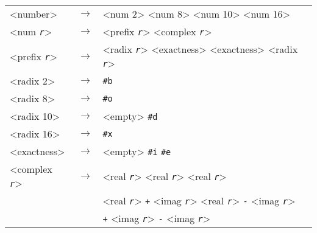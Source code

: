   {\footnotesize
\begin{tabular}[H]{lcl}

\textless{}number\textgreater{} & \(\longrightarrow\) & \textless{}num 2\textgreater{} \textbar{} \textless{}num 8\textgreater{} \textbar{} \textless{}num 10\textgreater{} \textbar{} \textless{}num 16\textgreater{} \\

\textless{}num \texttt{\textit{r}}\textgreater{} & \(\longrightarrow\) & \textless{}prefix \texttt{\textit{r}}\textgreater{} \textless{}complex \texttt{\textit{r}}\textgreater{} \\

\textless{}prefix \texttt{\textit{r}}\textgreater{} & \(\longrightarrow\) & \textless{}radix \texttt{\textit{r}}\textgreater{} \textless{}exactness\textgreater{} \textbar{} \textless{}exactness\textgreater{} \textless{}radix \texttt{\textit{r}}\textgreater{} \\

\textless{}radix 2\textgreater{} & \(\longrightarrow\) & \texttt{\#{}b} \\

\textless{}radix 8\textgreater{} & \(\longrightarrow\) & \texttt{\#{}o} \\

\textless{}radix 10\textgreater{} & \(\longrightarrow\) & \textless{}empty\textgreater{} \textbar{} \texttt{\#{}d} \\

\textless{}radix 16\textgreater{} & \(\longrightarrow\) & \texttt{\#{}x} \\

\textless{}exactness\textgreater{} & \(\longrightarrow\) & \textless{}empty\textgreater{} \textbar{} \texttt{\#{}i} \textbar{} \texttt{\#{}e} \\

\textless{}complex \texttt{\textit{r}}\textgreater{} & \(\longrightarrow\) & \textless{}real \texttt{\textit{r}}\textgreater{} \textbar{} \textless{}real \texttt{\textit{r}}\textgreater{} \@{} \textless{}real \texttt{\textit{r}}\textgreater{} \\

  & \textbar{} & \textless{}real \texttt{\textit{r}}\textgreater{} \texttt{+} \textless{}imag \texttt{\textit{r}}\textgreater{} \textbar{} \textless{}real \texttt{\textit{r}}\textgreater{} \texttt{-} \textless{}imag \texttt{\textit{r}}\textgreater{} \\

  & \textbar{} & \texttt{+} \textless{}imag \texttt{\textit{r}}\textgreater{} \textbar{} \texttt{-} \textless{}imag \texttt{\textit{r}}\textgreater{} \\


\end{tabular}}
